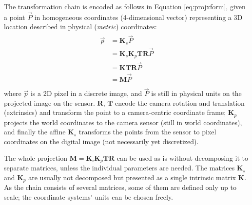 The transformation chain \cite[p. 163]{hartley03multiview} is encoded as follows in Equation \ref{eq:projxform}, given a point $\vec P$ in homogeneous coordinates (4-dimensional vector) representing a 3D location described in physical (\emph{metric}) coordinates:
\begin{align} \label{eq:projxform} \begin{split}
	\vec p
	&= \bm K_s \vec P\\
	&= \bm K_s \bm K_p \bm T \bm R \vec P\\
	&= \bm K \bm T \bm R \vec P\\
	&= \bm M \vec P\\
\end{split} \end{align}
where $\vec p$ is a 2D pixel in a discrete image, and $\vec P$ is still in physical units on the projected image on the sensor.
$\bm R$, $\bm T$ encode the camera rotation and translation (extrinsics) and transform the point to a camera-centric coordinate frame;
$\bm K_p$ projects the world coordinates to the camera sensor (still in world coordinates), and finally the affine $\bm K_s$ transforms the points from the sensor to pixel coordinates on the digital image (not necessarily yet discretized).


The whole projection $\bm M = \bm K_i \bm K_p \bm T \bm R$ can be used as-is without decomposing it to separate matrices, unless the individual parameters are needed.
The matrices $\bm K_s$ and $\bm K_p$ are usually not decomposed but presented as a single intrinsic matrix $\bm K$.
As the chain consists of several matrices, some of them are defined only up to scale; the coordinate systems' units can be chosen freely.


